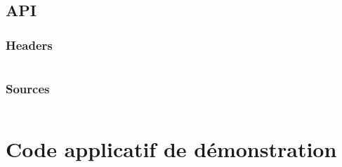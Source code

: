 \documentclass[a4paper, 11pt, svgnames]{report}
\begin{document}
\begin{appendices}
        \section{API}
        \subsection{Headers}
        \inputminted[breaklines]{C}{../quartus/ip/BCH/inc/BCHAPI.h}
        \subsection{Sources}
        \inputminted[breaklines]{C}{../quartus/ip/BCH/src/BCHAPI.c}

        \chapter{Code applicatif de démonstration}
        \inputminted[breaklines]{C}{../quartus/software/BCH/main.c}


    \end{appendices}
\end{document}
